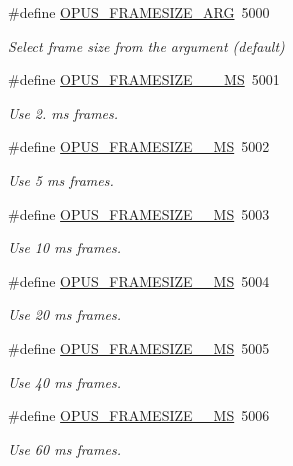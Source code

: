 \begin{DoxyCompactItemize}
\#define \hyperlink{group__opus__ctlvalues_ga0371f264203138ca92a3705c9c0ac39d}{O\+P\+U\+S\+\_\+\+F\+R\+A\+M\+E\+S\+I\+Z\+E\+\_\+\+A\+RG}~5000
\begin{DoxyCompactList}\small\item\em Select frame size from the argument (default) \end{DoxyCompactList}\item 
\#define \hyperlink{group__opus__ctlvalues_ga4696f62216f4afb1493471bb4c25baea}{O\+P\+U\+S\+\_\+\+F\+R\+A\+M\+E\+S\+I\+Z\+E\+\_\+\_\+\_\+\+MS}~5001
\begin{DoxyCompactList}\small\item\em Use 2. ms frames. \end{DoxyCompactList}\item 
\#define \hyperlink{group__opus__ctlvalues_gab2e88add9d69a0828ca23efc7bbb41be}{O\+P\+U\+S\+\_\+\+F\+R\+A\+M\+E\+S\+I\+Z\+E\+\_\+\_\+\+MS}~5002
\begin{DoxyCompactList}\small\item\em Use 5 ms frames. \end{DoxyCompactList}\item 
\#define \hyperlink{group__opus__ctlvalues_ga39d5606c61c4cd21e6ae2f1259a1f15f}{O\+P\+U\+S\+\_\+\+F\+R\+A\+M\+E\+S\+I\+Z\+E\+\_\+\_\+\+MS}~5003
\begin{DoxyCompactList}\small\item\em Use 10 ms frames. \end{DoxyCompactList}\item 
\#define \hyperlink{group__opus__ctlvalues_gacfce47959bdaa8581fdc68cec3be2bfb}{O\+P\+U\+S\+\_\+\+F\+R\+A\+M\+E\+S\+I\+Z\+E\+\_\+\_\+\+MS}~5004
\begin{DoxyCompactList}\small\item\em Use 20 ms frames. \end{DoxyCompactList}\item 
\#define \hyperlink{group__opus__ctlvalues_ga268935a23f6d8a8ae6bb3d11ac6ae172}{O\+P\+U\+S\+\_\+\+F\+R\+A\+M\+E\+S\+I\+Z\+E\+\_\+\_\+\+MS}~5005
\begin{DoxyCompactList}\small\item\em Use 40 ms frames. \end{DoxyCompactList}\item 
\#define \hyperlink{group__opus__ctlvalues_gac8178be7f02dc908c022cc3bb5c6c252}{O\+P\+U\+S\+\_\+\+F\+R\+A\+M\+E\+S\+I\+Z\+E\+\_\+\_\+\+MS}~5006
\begin{DoxyCompactList}\small\item\em Use 60 ms frames. \end{DoxyCompactList}\end{DoxyCompactItemize}



